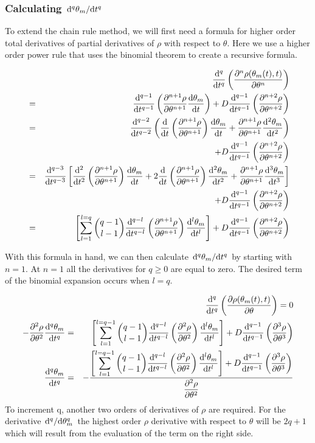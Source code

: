 \documentclass[11pt]{article} %
\begin{document}
\subsubsection{Calculating $ \dv*[q]{\theta_m}{t} $}

To extend the chain rule method, we will first need a formula for higher order total derivatives of partial derivatives of $ \rho $ with respect to $ \theta $. Here we use a higher order power rule that uses the binomial theorem to create a recursive formula.

\begin{eqnarray}
& &  \dv[q]{t} \left( \pdv[n]{\rho(\theta_m(t),t)}{\theta} \right) \\
& = & \dv[q-1]{t} \left( \pdv[n+1]{\rho}{\theta} \dv{\theta_m}{t} \right)+ D \dv[q-1]{t} \left( \pdv[n+2]{\rho}{\theta} \right) \\
& = & \dv[q-2]{t} \left( \dv{t} \left( \pdv[n+1]{\rho}{\theta} \right) \dv{\theta_m}{t} +  \pdv[n+1]{\rho}{\theta} \dv[2]{\theta_m}{t} \right) \\
&    & + D \dv[q-1]{t} \left( \pdv[n+2]{\rho}{\theta} \right) \\
& = & \dv[q-3]{t} \left[ \dv[2]{t} \left( \pdv[n+1]{\rho}{\theta} \right) \dv{\theta_m}{t} +  2 \dv{t} \left( \pdv[n+1]{\rho}{\theta} \right) \dv[2]{\theta_m}{t} +  \pdv[n+1]{\rho}{\theta} \dv[3]{\theta_m}{t} \right] \\
&    & + D \dv[q-1]{t} \left( \pdv[n+2]{\rho}{\theta} \right) \\
& = & \left[ \sum_{l=1}^{l=q} \binom{q-1}{l-1} \dv[q-l]{t} \left( \pdv[n+1]{\rho}{\theta} \right) \dv[l]{\theta_m}{t} \right] + D \dv[q-1]{t} \left( \pdv[n+2]{\rho}{\theta} \right)
\end{eqnarray}

With this formula in hand, we can then calculate $ \dv*[q]{\theta_m}{t} $ by starting with $ n = 1 $. At $ n = 1 $ all the derivatives for $ q \geq 0 $ are equal to zero. The desired term of the binomial expansion occurs when $ l = q $.

\begin{eqnarray}
& & \dv[q]{t} \left( \pdv{\rho(\theta_m(t),t)}{\theta} \right) =  0 \\
- \pdv[2]{\rho}{\theta} \dv[q]{\theta_m}{t} & = & \left[ \sum_{l=1}^{l=q-1} \binom{q-1}{l-1} \dv[q-l]{t} \left( \pdv[2]{\rho}{\theta} \right) \dv[l]{\theta_m}{t} \right] + D \dv[q-1]{t} \left( \pdv[3]{\rho}{\theta} \right) \\ 
\dv[q]{\theta_m}{t} & = & - \frac{\displaystyle \left[ \sum_{l=1}^{l=q-1} \binom{q-1}{l-1} \dv[q-l]{t} \left( \pdv[2]{\rho}{\theta} \right) \dv[l]{\theta_m}{t} \right] + D \dv[q-1]{t} \left( \pdv[3]{\rho}{\theta} \right)  }
{\displaystyle \pdv[2]{\rho}{\theta} }
\end{eqnarray}
To increment q, another two orders of derivatives of $ \rho $ are required. For the derivative $ \dv*[q]{\theta_m} $ the highest order $ \rho $ derivative with respect to $ \theta $  will be $ 2q+1 $ which will result from the evaluation of the term on the right side. 
\end{document}
